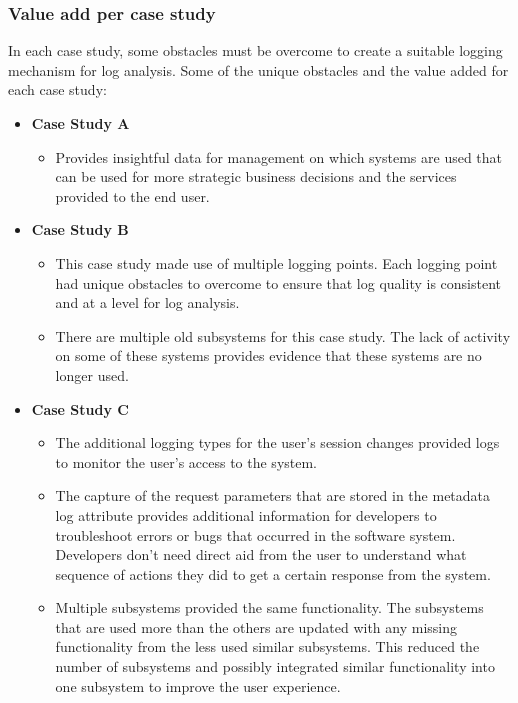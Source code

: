 \subsubsection{Value add per case study}
In each case study, some obstacles must be overcome to create a suitable logging mechanism for log analysis. Some of the unique obstacles and the value added for each case study:

\begin{itemize}
	\item \textbf{Case Study A}
		\begin{itemize}
			\item Provides insightful data for management on which systems are used that can be used for more strategic business decisions and the services provided to the end user.
		\end{itemize}
	\item \textbf{Case Study B}
	\begin{itemize}
		\item This case study made use of multiple logging points. Each logging point had unique obstacles to overcome to ensure that log quality is consistent and at a level for log analysis.
		\item There are multiple old subsystems for this case study. The lack of activity on some of these systems provides evidence that these systems are no longer used.
	\end{itemize}
	\item \textbf{Case Study C}
	\begin{itemize}
		\item The additional logging types for the user's session changes provided logs to monitor the user's access to the system.
		\item The capture of the request parameters that are stored in the metadata log attribute provides additional information for developers to troubleshoot errors or bugs that occurred in the software system. Developers don't need direct aid from the user to understand what sequence of actions they did to get a certain response from the system.
		\item Multiple subsystems provided the same functionality. The subsystems that are used more than the others are updated with any missing functionality from the less used similar subsystems. This reduced the number of subsystems and possibly integrated similar functionality into one subsystem to improve the user experience. 
	\end{itemize}
\end{itemize}

